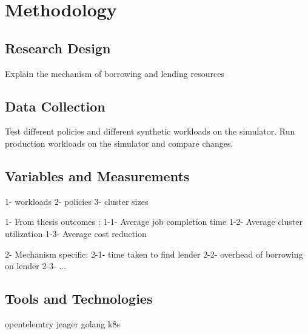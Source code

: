 \section{Methodology}

\subsection{Research Design}
Explain the mechanism of borrowing and lending resources 

\subsection{Data Collection}
Test different policies and different synthetic workloads on the simulator. 
Run production workloads on the simulator and compare changes.

\subsection{Variables and Measurements}
1- workloads %
2- policies 
3- cluster sizes

1- From thesis outcomes :
    1-1- Average job completion time
    1-2- Average cluster utilization
    1-3- Average cost reduction

2- Mechanism specific: 
   2-1- time taken to find lender
   2-2- overhead of borrowing on lender
   2-3- ... 
\subsection{Tools and Technologies}
opentelemtry
jeager
golang
k8s